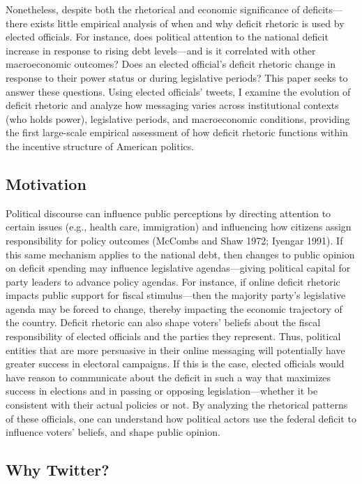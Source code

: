 \documentclass[
  12pt,
]{article}
\begin{document}
Nonetheless, despite both the rhetorical and economic significance of
deficits---there exists little empirical analysis of when and why
deficit rhetoric is used by elected officials. For instance, does
political attention to the national deficit increase in response to
rising debt levels---and is it correlated with other macroeconomic
outcomes? Does an elected official's deficit rhetoric change in response
to their power status or during legislative periods? This paper seeks to
answer these questions. Using elected officials' tweets, I examine the
evolution of deficit rhetoric and analyze how messaging varies across
institutional contexts (who holds power), legislative periods, and
macroeconomic conditions, providing the first large-scale empirical
assessment of how deficit rhetoric functions within the incentive
structure of American politics.

\subsection{Motivation}\label{motivation}

Political discourse can influence public perceptions by directing
attention to certain issues (e.g., health care, immigration) and
influencing how citizens assign responsibility for policy outcomes
(McCombs and Shaw 1972; Iyengar 1991). If this same mechanism applies to
the national debt, then changes to public opinion on deficit spending
may influence legislative agendas---giving political capital for party
leaders to advance policy agendas. For instance, if online deficit
rhetoric impacts public support for fiscal stimulus---then the majority
party's legislative agenda may be forced to change, thereby impacting
the economic trajectory of the country. Deficit rhetoric can also shape
voters' beliefs about the fiscal responsibility of elected officials and
the parties they represent. Thus, political entities that are more
persuasive in their online messaging will potentially have greater
success in electoral campaigns. If this is the case, elected officials
would have reason to communicate about the deficit in such a way that
maximizes success in elections and in passing or opposing
legislation---whether it be consistent with their actual policies or
not. By analyzing the rhetorical patterns of these officials, one can
understand how political actors use the federal deficit to influence
voters' beliefs, and shape public opinion.

\subsection{Why Twitter?}\label{why-twitter}
\end{document}
